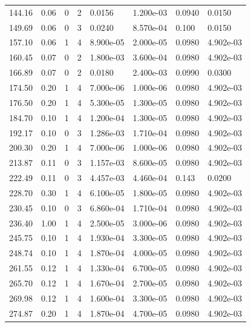 \documentclass[preview]{standalone}
\begin{document}
{{\begin{tabular}{L{1.2cm}C{1.2cm} C{0.3cm}C{0.5cm} C{1.4cm}C{1.4cm} C{1.4cm}C{1.4cm}}
  144.16  &  0.06  & 0     &  2 &  0.0156  & 1.200e-03  & 0.0940 &  0.0150   \\ 
  149.69  &  0.06  & 0     &  3 &  0.0240  & 8.570e-04  & 0.100 &  0.0150   \\ 
  157.10  &  0.06  & 1     &  4 &  8.900e-05  & 2.000e-05  & 0.0980 &  4.902e-03   \\ 
  160.45  &  0.07  & 0     &  2 &  1.800e-03  & 3.600e-04  & 0.0980 &  4.902e-03   \\ 
  166.89  &  0.07  & 0     &  2 &  0.0180  & 2.400e-03  & 0.0990 &  0.0300   \\ 
  174.50  &  0.20  & 1     &  4 &  7.000e-06  & 1.000e-06  & 0.0980 &  4.902e-03   \\ 
  176.50  &  0.20  & 1     &  4 &  5.300e-05  & 1.300e-05  & 0.0980 &  4.902e-03   \\ 
  184.70  &  0.10  & 1     &  4 &  1.200e-04  & 1.300e-05  & 0.0980 &  4.902e-03   \\ 
  192.17  &  0.10  & 0     &  3 &  1.286e-03  & 1.710e-04  & 0.0980 &  4.902e-03   \\ 
  200.30  &  0.20  & 1     &  4 &  7.000e-06  & 1.000e-06  & 0.0980 &  4.902e-03   \\ 
  213.87  &  0.11  & 0     &  3 &  1.157e-03  & 8.600e-05  & 0.0980 &  4.902e-03   \\ 
  222.49  &  0.11  & 0     &  3 &  4.457e-03  & 4.460e-04  & 0.143 &  0.0200   \\ 
  228.70  &  0.30  & 1     &  4 &  6.100e-05  & 1.800e-05  & 0.0980 &  4.902e-03   \\ 
  230.45  &  0.10  & 0     &  3 &  6.860e-04  & 1.710e-04  & 0.0980 &  4.902e-03   \\ 
  236.40  &  1.00  & 1     &  4 &  2.500e-05  & 3.000e-06  & 0.0980 &  4.902e-03   \\ 
  245.75  &  0.10  & 1     &  4 &  1.930e-04  & 3.300e-05  & 0.0980 &  4.902e-03   \\ 
  248.74  &  0.10  & 1     &  4 &  1.870e-04  & 4.000e-05  & 0.0980 &  4.902e-03   \\ 
  261.55  &  0.12  & 1     &  4 &  1.330e-04  & 6.700e-05  & 0.0980 &  4.902e-03   \\ 
  265.70  &  0.12  & 1     &  4 &  1.670e-04  & 2.700e-05  & 0.0980 &  4.902e-03   \\ 
  269.98  &  0.12  & 1     &  4 &  1.600e-04  & 3.300e-05  & 0.0980 &  4.902e-03   \\ 
  274.87  &  0.20  & 1     &  4 &  1.870e-04  & 4.700e-05  & 0.0980 &  4.902e-03   \\ 

\end{tabular}}}
\end{document}
